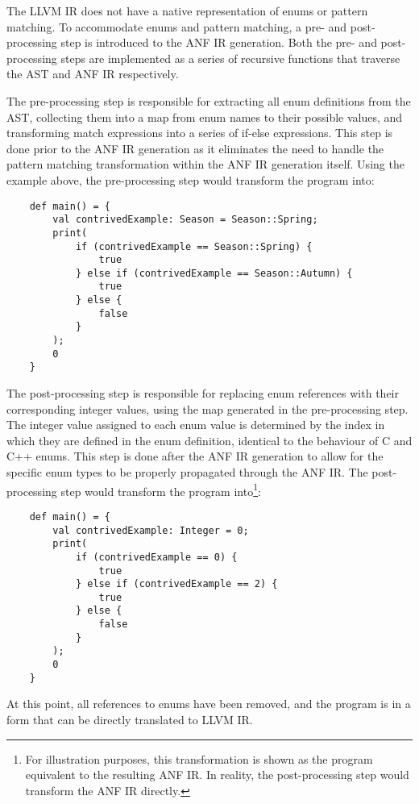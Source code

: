 The LLVM IR does not have a native representation of enums or pattern matching. To accommodate enums
and pattern matching, a pre- and post-processing step is introduced to the ANF IR generation. Both
the pre- and post-processing steps are implemented as a series of recursive functions that traverse
the AST and ANF IR respectively.

The pre-processing step is responsible for extracting all enum definitions from the AST, collecting
them into a map from enum names to their possible values, and transforming match expressions into a
series of if-else expressions. This step is done prior to the ANF IR generation as it eliminates the
need to handle the pattern matching transformation within the ANF IR generation itself. Using the
example above, the pre-processing step would transform the program into:

\begin{verbatim}
    def main() = {
        val contrivedExample: Season = Season::Spring;
        print(
            if (contrivedExample == Season::Spring) {
                true
            } else if (contrivedExample == Season::Autumn) {
                true
            } else {
                false
            }
        );
        0
    }
\end{verbatim}

The post-processing step is responsible for replacing enum references with their corresponding
integer values, using the map generated in the pre-processing step. The integer value assigned to
each enum value is determined by the index in which they are defined in the enum definition,
identical to the behaviour of C and C++ enums. This step is done after the ANF IR generation to
allow for the specific enum types to be properly propagated through the ANF IR. The post-processing
step would transform the program into\footnote{For illustration purposes, this transformation is
    shown as the program equivalent to the resulting ANF IR. In reality, the post-processing step would
    transform the ANF IR directly.}:

\begin{verbatim}
    def main() = {
        val contrivedExample: Integer = 0;
        print(
            if (contrivedExample == 0) {
                true
            } else if (contrivedExample == 2) {
                true
            } else {
                false
            }
        );
        0
    }
\end{verbatim}

\noindent At this point, all references to enums have been removed, and the program is in a form that can be
directly translated to LLVM IR.

